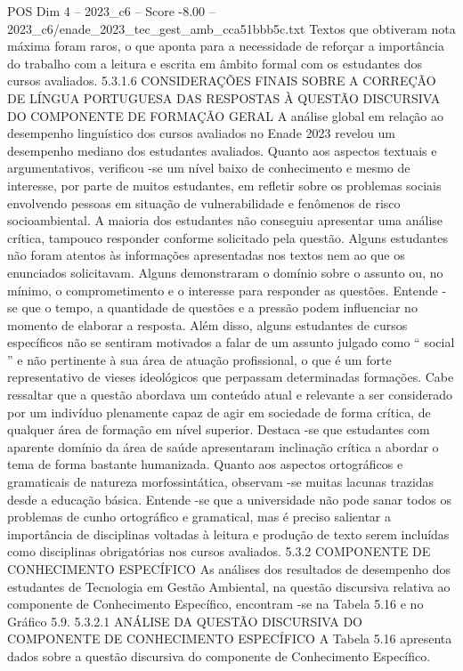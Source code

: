 \begin{textsample}{POS Dim 4 – 2023\_c6 – Score -8.00 – 2023\_c6/enade\_2023\_tec\_gest\_amb\_cca51bbb5c.txt}
Textos que obtiveram nota máxima foram raros, o que aponta para a necessidade de reforçar a importância do trabalho com a leitura e escrita em âmbito formal com os estudantes dos cursos avaliados. 5.3.1.6 CONSIDERAÇÕES FINAIS SOBRE A CORREÇÃO DE LÍNGUA PORTUGUESA DAS RESPOSTAS À QUESTÃO DISCURSIVA DO COMPONENTE DE FORMAÇÃO GERAL A análise global em relação ao desempenho linguístico dos cursos avaliados no Enade 2023 revelou um desempenho mediano dos estudantes avaliados.
Quanto aos aspectos textuais e argumentativos, verificou -se um nível baixo de conhecimento e mesmo de interesse, por parte de muitos estudantes, em refletir sobre os problemas sociais envolvendo pessoas em situação de vulnerabilidade e fenômenos de risco socioambiental.
A maioria dos estudantes não conseguiu apresentar uma análise crítica, tampouco responder conforme solicitado pela questão.
Alguns estudantes não foram atentos às informações apresentadas nos textos nem ao que os enunciados solicitavam.
Alguns demonstraram o domínio sobre o assunto ou, no mínimo, o comprometimento e o interesse para responder as questões.
Entende -se que o tempo, a quantidade de questões e a pressão podem influenciar no momento de elaborar a resposta.
Além disso, alguns estudantes de cursos específicos não se sentiram motivados a falar de um assunto julgado como “ social ” e não pertinente à sua área de atuação profissional, o que é um forte representativo de vieses ideológicos que perpassam determinadas formações.
Cabe ressaltar que a questão abordava um conteúdo atual e relevante a ser considerado por um indivíduo plenamente capaz de agir em sociedade de forma crítica, de qualquer área de formação em nível superior.
Destaca -se que estudantes com aparente domínio da área de saúde apresentaram inclinação crítica a abordar o tema de forma bastante humanizada.
Quanto aos aspectos ortográficos e gramaticais de natureza morfossintática, observam -se muitas lacunas trazidas desde a educação básica.
Entende -se que a universidade não pode sanar todos os problemas de cunho ortográfico e gramatical, mas é preciso salientar a importância de disciplinas voltadas à leitura e produção de texto serem incluídas como disciplinas obrigatórias nos cursos avaliados. 5.3.2 COMPONENTE DE CONHECIMENTO ESPECÍFICO As análises dos resultados de desempenho dos estudantes de Tecnologia em Gestão Ambiental, na questão discursiva relativa ao componente de Conhecimento Específico, encontram -se na Tabela 5.16 e no Gráfico 5.9. 5.3.2.1 ANÁLISE DA QUESTÃO DISCURSIVA DO COMPONENTE DE CONHECIMENTO ESPECÍFICO A Tabela 5.16 apresenta dados sobre a questão discursiva do componente de Conhecimento Específico.

\end{textsample}
